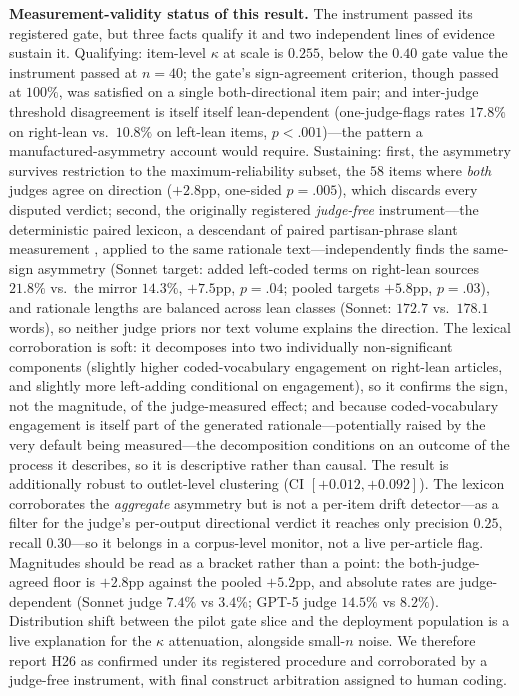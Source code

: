 \documentclass{article}
\newcommand{\kap}{\kappa}
\begin{document}
\textbf{Measurement-validity status of this result.} The instrument passed its registered gate, but three facts
qualify it and two independent lines of evidence sustain it. Qualifying:
item-level $\kap$ at scale is $0.255$, below the $0.40$ gate value the
instrument passed at $n{=}40$; the gate's sign-agreement criterion,
though passed at $100\%$, was satisfied on a single both-directional
item pair; and inter-judge threshold disagreement is itself
itself lean-dependent (one-judge-flags rates $17.8\%$ on right-lean vs.\
$10.8\%$ on left-lean items, $p<.001$)---the pattern a
manufactured-asymmetry account would require. Sustaining: first, the
asymmetry survives restriction to the maximum-reliability subset, the
$58$ items where \emph{both} judges agree on direction ($+2.8$pp,
one-sided $p=.005$), which discards every disputed verdict; second, the
originally registered \emph{judge-free} instrument---the deterministic
paired lexicon, a descendant of paired partisan-phrase slant measurement
\citep{gentzkow2010slant}, applied to the same rationale
text---independently finds
the same-sign asymmetry (Sonnet target: added left-coded terms on
right-lean sources $21.8\%$ vs.\ the mirror $14.3\%$, $+7.5$pp,
$p=.04$; pooled targets $+5.8$pp, $p=.03$), and rationale
lengths are balanced across lean classes (Sonnet: $172.7$ vs.\ $178.1$
words), so
neither judge priors nor text volume explains the direction. The
lexical corroboration is soft: it decomposes into two individually
non-significant components (slightly higher coded-vocabulary engagement
on right-lean articles, and slightly more left-adding conditional on
engagement), so it confirms the sign, not the magnitude, of the
judge-measured effect; and because coded-vocabulary engagement is
itself part of the generated rationale---potentially raised by the very
default being measured---the decomposition conditions on an outcome of
the process it describes, so it is descriptive rather than causal. The result
is additionally robust to outlet-level clustering (CI $[+0.012,
+0.092]$). The lexicon corroborates the \emph{aggregate} asymmetry but
is not a per-item drift detector---as a filter for the judge's
per-output directional verdict it reaches only precision $0.25$, recall
$0.30$---so it belongs in a corpus-level monitor, not a live
per-article flag. Magnitudes should be read as a bracket rather than a point:
the both-judge-agreed floor is $+2.8$pp against the pooled $+5.2$pp, and
absolute rates are judge-dependent (Sonnet judge $7.4\%$ vs $3.4\%$;
GPT-5 judge $14.5\%$ vs $8.2\%$). Distribution shift between the pilot
gate slice and the deployment population is a live explanation for the
$\kap$ attenuation, alongside small-$n$ noise. We therefore report H26
as confirmed under its registered
procedure and corroborated by a judge-free instrument, with final
construct arbitration assigned to human coding.
\end{document}
